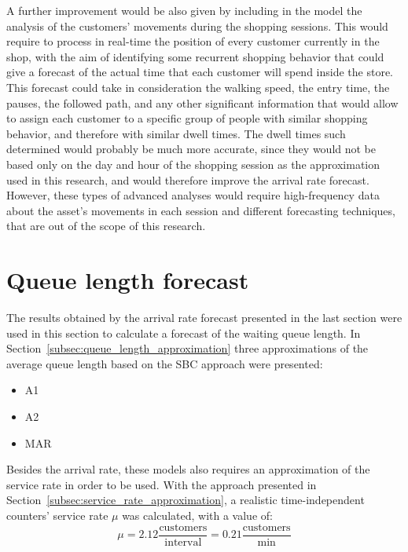 A further improvement would be also given by including in the model the analysis of the customers’ movements during the shopping sessions. This would require to process in real-time the position of every customer currently in the shop, with the aim of identifying some recurrent shopping behavior that could give a forecast of the actual time that each customer will spend inside the store. This forecast could take in consideration the walking speed, the entry time, the pauses, the followed path, and any other significant information that would allow to assign each customer to a specific group of people with similar shopping behavior, and therefore with similar dwell times. The dwell times such determined would probably be much more accurate, since they would not be based only on the day and hour of the shopping session as the approximation used in this research, and would therefore improve the arrival rate forecast. However, these types of advanced analyses would require high-frequency data about the asset’s movements in each session and different forecasting techniques, that are out of the scope of this research.

\section{Queue length forecast}
\label{sec:queue_length_forecast_results}

The results obtained by the arrival rate forecast presented in the last section were used in this section to calculate a forecast of the waiting queue length. In Section~\ref{subsec:queue_length_approximation} three approximations of the average queue length based on the SBC approach were presented:
\begin{itemize}
  \item A1
  \item A2
  \item MAR
\end{itemize}

Besides the arrival rate, these models also requires an approximation of the service rate in order to be used. With the approach presented in Section~\ref{subsec:service_rate_approximation}, a realistic time-independent counters’ service rate \( \mu \) was calculated, with a value of:
\[
  \mu = 2.12 \frac{\text{customers}}{\text{interval}} = 0.21 \frac{\text{customers}}{\text{min}}
\]

